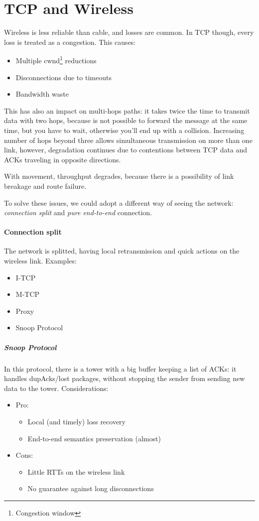 \section{TCP and Wireless}

Wireless is less reliable than cable, and losses are common. In TCP though,
every loss is treated as a congestion. This causes:
\begin{itemize}
\item Multiple cwnd\footnote{Congestion window} reductions
\item Disconnections due to timeouts
\item Bandwidth waste
\end{itemize}

This has also an impact on multi-hops paths: it takes twice the time to
transmit data with two hops, because is not possible to forward the message at
the same time, but you have to wait, otherwise you'll end up with a collision.
Increasing number of hops beyond three allows simultaneous transmission on more
than one link, however, degradation continues due to contentions between TCP
data and ACKs traveling in opposite directions.

With movement, throughput degrades, because there is a possibility of link
breakage and route failure.

To solve these issues, we could adopt a different way of seeing the network:
\textit{connection split} and \textit{pure end-to-end} connection.

\paragraph*{Connection split} The network is splitted, having local
retransmission and quick actions on the wireless link.
Examples:
\begin{itemize}
\item I-TCP
\item M-TCP
\item Proxy
\item Snoop Protocol
\end{itemize}

\subparagraph*{Snoop Protocol} In this protocol, there is a tower with a big
buffer keeping a list of ACKs: it handles dupAcks/lost packages, without
stopping the sender from sending new data to the tower.
Considerations:
\begin{itemize}
\item Pro:
  \begin{itemize}
  \item Local (and timely) loss recovery
  \item End-to-end semantics preservation (almost)
  \end{itemize}
\item Cons:
  \begin{itemize}
  \item Little RTTs on the wireless link
  \item No guarantee against long disconnections
  \end{itemize}
\end{itemize}

